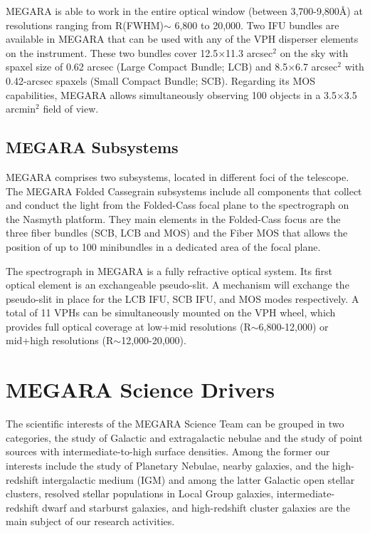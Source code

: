 MEGARA is able to work in the entire optical window (between 3,700-9,800\AA) at resolutions ranging from R(FWHM)$\sim$ 6,800 to 20,000. Two IFU bundles are available in MEGARA that can be used with any of the VPH disperser elements on the instrument. These two bundles cover 12.5$\times$11.3 arcsec$^2$ on the sky with spaxel size of 0.62 arcsec (Large Compact Bundle; LCB) and 8.5$\times$6.7 arcsec$^2$ with 0.42-arcsec spaxels (Small Compact Bundle; SCB). Regarding its MOS capabilities, MEGARA allows simultaneously observing 100 objects in a 3.5$\times$3.5 arcmin$^2$ field of view. 

\subsection{MEGARA Subsystems}
MEGARA comprises two subsystems, located in different foci of the telescope. The MEGARA Folded Cassegrain subsystems include all components that collect and conduct the light from the Folded-Cass focal plane to the spectrograph on the Nasmyth platform. They main elements in the Folded-Cass focus are the three fiber bundles (SCB, LCB and MOS) and the Fiber MOS that allows the position of up to 100 minibundles in a dedicated area of the focal plane.

The spectrograph in MEGARA is a fully refractive optical system. Its first optical element is an exchangeable pseudo-slit. A mechanism will exchange the pseudo-slit in place for the LCB IFU, SCB IFU, and MOS modes respectively. A total of 11 VPHs can be simultaneously mounted on the VPH wheel, which  provides full optical coverage at low+mid resolutions (R$\sim$6,800-12,000) or mid+high
resolutions (R$\sim$12,000-20,000).

\section{MEGARA Science Drivers}
The scientific interests of the MEGARA Science Team
can be grouped in two categories, the study of Galactic and extragalactic nebulae and the study of point sources with intermediate-to-high surface densities. Among the former our interests include the study of Planetary Nebulae, nearby galaxies, and the high-redshift intergalactic medium (IGM) and among the latter Galactic open stellar clusters, resolved stellar populations in Local Group galaxies, intermediate-redshift dwarf and starburst galaxies, and high-redshift cluster galaxies are the main subject of
our research activities. 

